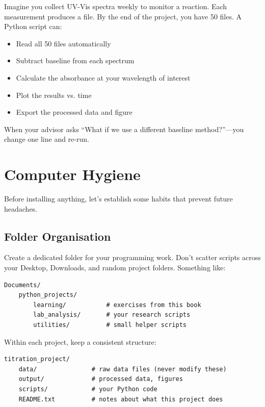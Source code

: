 \begin{labexample}
Imagine you collect UV-Vis spectra weekly to monitor a reaction. Each measurement produces a file. By the end of the project, you have 50 files. A Python script can:
\begin{itemize}
    \item Read all 50 files automatically
    \item Subtract baseline from each spectrum
    \item Calculate the absorbance at your wavelength of interest
    \item Plot the results vs. time
    \item Export the processed data and figure
\end{itemize}
When your advisor asks ``What if we use a different baseline method?''---you change one line and re-run.
\end{labexample}

\section{Computer Hygiene}
\label{sec:hygiene}

Before installing anything, let's establish some habits that prevent future headaches.

\subsection{Folder Organisation}

Create a dedicated folder for your programming work. Don't scatter scripts across your Desktop, Downloads, and random project folders. Something like:

\begin{lstlisting}[style=shellstyle]
Documents/
    python_projects/
        learning/           # exercises from this book
        lab_analysis/       # your research scripts
        utilities/          # small helper scripts
\end{lstlisting}

Within each project, keep a consistent structure:

\begin{lstlisting}[style=shellstyle]
titration_project/
    data/               # raw data files (never modify these)
    output/             # processed data, figures
    scripts/            # your Python code
    README.txt          # notes about what this project does
\end{lstlisting}

